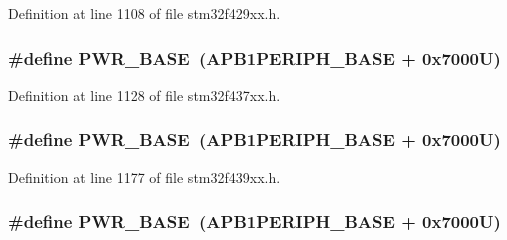 Definition at line 1108 of file stm32f429xx.\+h.

\subsubsection[{\texorpdfstring{P\+W\+R\+\_\+\+B\+A\+SE}{PWR_BASE}}]{\setlength{\rightskip}{0pt plus 5cm}\#define P\+W\+R\+\_\+\+B\+A\+SE~({\bf A\+P\+B1\+P\+E\+R\+I\+P\+H\+\_\+\+B\+A\+SE} + 0x7000\+U)}\hypertarget{group___peripheral__memory__map_gac691ec23dace8b7a649a25acb110217a}{}\label{group___peripheral__memory__map_gac691ec23dace8b7a649a25acb110217a}


Definition at line 1128 of file stm32f437xx.\+h.

\subsubsection[{\texorpdfstring{P\+W\+R\+\_\+\+B\+A\+SE}{PWR_BASE}}]{\setlength{\rightskip}{0pt plus 5cm}\#define P\+W\+R\+\_\+\+B\+A\+SE~({\bf A\+P\+B1\+P\+E\+R\+I\+P\+H\+\_\+\+B\+A\+SE} + 0x7000\+U)}\hypertarget{group___peripheral__memory__map_gac691ec23dace8b7a649a25acb110217a}{}\label{group___peripheral__memory__map_gac691ec23dace8b7a649a25acb110217a}


Definition at line 1177 of file stm32f439xx.\+h.

\subsubsection[{\texorpdfstring{P\+W\+R\+\_\+\+B\+A\+SE}{PWR_BASE}}]{\setlength{\rightskip}{0pt plus 5cm}\#define P\+W\+R\+\_\+\+B\+A\+SE~({\bf A\+P\+B1\+P\+E\+R\+I\+P\+H\+\_\+\+B\+A\+SE} + 0x7000\+U)}\hypertarget{group___peripheral__memory__map_gac691ec23dace8b7a649a25acb110217a}{}\label{group___peripheral__memory__map_gac691ec23dace8b7a649a25acb110217a}


